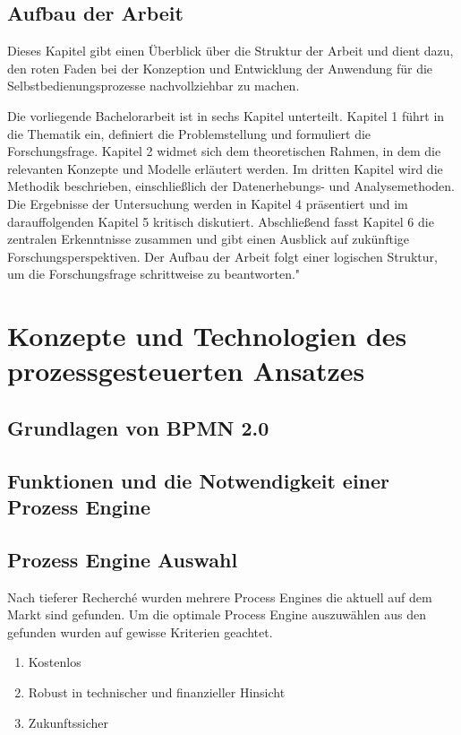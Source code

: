 \subsection{Aufbau der Arbeit}
Dieses Kapitel gibt einen Überblick über die Struktur der Arbeit und dient dazu, den roten Faden bei der Konzeption und Entwicklung der Anwendung für die Selbstbedienungsprozesse nachvollziehbar zu machen.

Die vorliegende Bachelorarbeit ist in sechs Kapitel unterteilt. Kapitel 1 führt in die Thematik ein, definiert die Problemstellung und formuliert die Forschungsfrage. Kapitel 2 widmet sich dem theoretischen Rahmen, in dem die relevanten Konzepte und Modelle erläutert werden. Im dritten Kapitel wird die Methodik beschrieben, einschließlich der Datenerhebungs- und Analysemethoden. Die Ergebnisse der Untersuchung werden in Kapitel 4 präsentiert und im darauffolgenden Kapitel 5 kritisch diskutiert. Abschließend fasst Kapitel 6 die zentralen Erkenntnisse zusammen und gibt einen Ausblick auf zukünftige Forschungsperspektiven. Der Aufbau der Arbeit folgt einer logischen Struktur, um die Forschungsfrage schrittweise zu beantworten."

\section{Konzepte und Technologien des prozessgesteuerten Ansatzes}
\subsection{Grundlagen von BPMN 2.0}
\paragraphandnewline{}
\subsection{Funktionen und die Notwendigkeit einer Prozess Engine}

\subsection{Prozess Engine Auswahl}
Nach tieferer Recherché wurden mehrere Process Engines die aktuell auf dem Markt sind gefunden. Um die optimale Process Engine auszuwählen aus den gefunden wurden auf gewisse Kriterien geachtet. 
\begin{enumerate}
    \item Kostenlos
    \item Robust in technischer und finanzieller Hinsicht
    \item Zukunftssicher
\end{enumerate}

